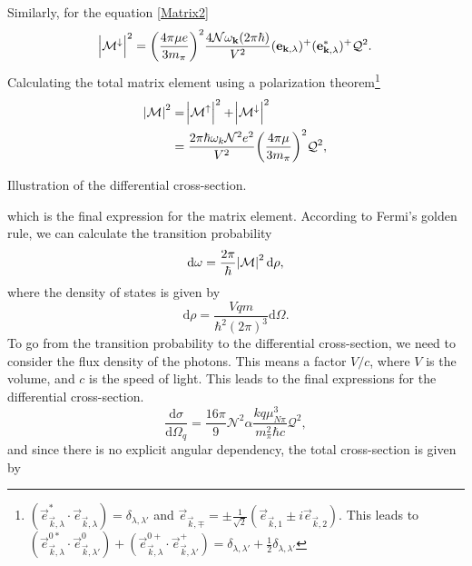 Similarly, for the equation \eqref{Matrix2}
\begin{equation}
	\abs{\mathcal{M}^\downarrow}^2 = \bigg( \frac{4\pi \mu e}{3 m_\pi}\bigg)^2 \frac{4\mathcal{N}\omega_{\bm{\mathrm{k}}}(2\pi\hbar)}{V^2}(\bm{\mathrm{e}}_{\bm{\mathrm{k}},\lambda})^+(\bm{\mathrm{e}}_{\bm{\mathrm{k}},\lambda}^*)^+ \mathcal{Q}^2.
\end{equation}
Calculating the total matrix element using a polarization theorem\footnote{$(\vec{e}_{\vec{k},\lambda}^*\cdot \vec{e}_{\vec{k},\lambda})=\delta_{\lambda,\lambda'}$ and $\vec{e}_{\vec{k},\mp}=\pm\frac{1}{\sqrt{2}}(\vec{e}_{\vec{k},1}\pm i\vec{e}_{\vec{k},2})$. This leads to $(\vec{e}^{0*}_{\vec{k},\lambda}\cdot\vec{e}^{0}_{\vec{k},\lambda'})+(\vec{e}^{0+}_{\vec{k},\lambda}\cdot\vec{e}^{+}_{\vec{k},\lambda'})=\delta_{\lambda,\lambda'}+\frac{1}{2}\delta_{\lambda,\lambda'}$}
\begin{align}
	\abs{\mathcal{M}}^2 &= \abs{\mathcal{M}^\uparrow}^2 + \abs{\mathcal{M}^\downarrow}^2 \\
	&= \frac{2\pi \hbar \omega_k \mathcal{N}^2 e^2}{V^2} \bigg( \frac{4\pi\mu}{3m_\pi}\bigg)^2 \mathcal{Q}^2,
\end{align}
\begin{marginfigure}
	\centering
	
	\caption{Illustration of the differential cross-section. }
	\label{fig:diffcrossillustration}
\end{marginfigure}  
which is the final expression for the matrix element. According to Fermi's golden rule, we can calculate the transition probability
\begin{equation}\label{domega}
	\text{d}\omega = \frac{2\pi}{\hbar} \abs{\mathcal{M}}^2 \text{d}\rho,
\end{equation}
where the density of states is given by
\begin{equation}\label{densityofstates}
	\text{d}\rho = \frac{Vqm }{\hbar^2 (2\pi)^3}\text{d}\Omega.
\end{equation}
To go from the transition probability to the differential cross-section, we need to consider the flux density of the photons. This means a factor $V/c$, where $V$ is the volume, and $c$ is the speed of light. This leads to the final expressions for the differential cross-section.
\begin{equation}\label{diffcrosssection}
	\frac{\text{d}\sigma}{\text{d}\Omega_q}=\frac{16 \pi}{9} \mathcal{N}^2 \alpha\frac{kq\mu^3_{N\pi}}{m_\pi^2 \hbar c}\mathcal{Q}^2,
\end{equation}
and since there is no explicit angular dependency, the total cross-section is given by
